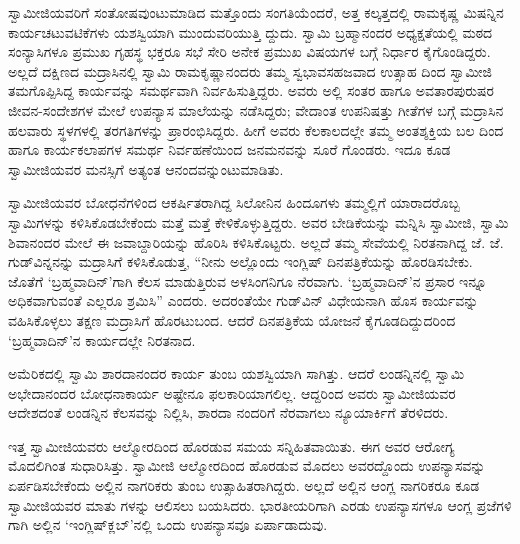 ಸ್ವಾಮೀಜಿಯವರಿಗೆ ಸಂತೋಷವುಂಟುಮಾಡಿದ ಮತ್ತೊಂದು ಸಂಗತಿಯೆಂದರೆ, ಅತ್ತ ಕಲ್ಕತ್ತದಲ್ಲಿ ರಾಮಕೃಷ್ಣ ಮಿಷನ್ನಿನ ಕಾರ್ಯಚಟುವಟಿಕೆಗಳು ಯಶಸ್ವಿಯಾಗಿ ಮುಂದುವರಿಯುತ್ತಿ ದ್ದುದು. ಸ್ವಾಮಿ ಬ್ರಹ್ಮಾನಂದರ ಅಧ್ಯಕ್ಷತೆಯಲ್ಲಿ ಮಠದ ಸಂನ್ಯಾಸಿಗಳೂ ಪ್ರಮುಖ ಗೃಹಸ್ಥ ಭಕ್ತರೂ ಸಭೆ ಸೇರಿ ಅನೇಕ ಪ್ರಮುಖ ವಿಷಯಗಳ ಬಗ್ಗೆ ನಿರ್ಧಾರ ಕೈಗೊಂಡಿದ್ದರು. ಅಲ್ಲದೆ ದಕ್ಷಿಣದ ಮದ್ರಾಸಿನಲ್ಲಿ ಸ್ವಾಮಿ ರಾಮಕೃಷ್ಣಾನಂದರು ತಮ್ಮ ಸ್ವಭಾವಸಹಜವಾದ ಉತ್ಸಾಹ ದಿಂದ ಸ್ವಾಮೀಜಿ ತಮಗೊಪ್ಪಿಸಿದ್ದ ಕಾರ್ಯವನ್ನು ಸಮರ್ಥವಾಗಿ ನಿರ್ವಹಿಸುತ್ತಿದ್ದರು. ಅವರು ಅಲ್ಲಿ ಸಂತರ ಹಾಗೂ ಅವತಾರಪುರುಷರ ಜೀವನ-ಸಂದೇಶಗಳ ಮೇಲೆ ಉಪನ್ಯಾಸ ಮಾಲೆಯನ್ನು ನಡೆಸಿದ್ದರು; ವೇದಾಂತ ಉಪನಿಷತ್ತು ಗೀತೆಗಳ ಬಗ್ಗೆ ಮದ್ರಾಸಿನ ಹಲವಾರು ಸ್ಥಳಗಳಲ್ಲಿ ತರಗತಿಗಳನ್ನು ಪ್ರಾರಂಭಿಸಿದ್ದರು. ಹೀಗೆ ಅವರು ಕೆಲಕಾಲದಲ್ಲೇ ತಮ್ಮ ಅಂತಶ್ಶಕ್ತಿಯ ಬಲ ದಿಂದ ಹಾಗೂ ಕಾರ್ಯಕಲಾಪಗಳ ಸಮರ್ಥ ನಿರ್ವಹಣೆಯಿಂದ ಜನಮನವನ್ನು ಸೂರೆ ಗೊಂಡರು. ಇದೂ ಕೂಡ ಸ್ವಾಮೀಜಿಯವರ ಮನಸ್ಸಿಗೆ ಅತ್ಯಂತ ಆನಂದವನ್ನುಂಟುಮಾಡಿತು.

ಸ್ವಾಮೀಜಿಯವರ ಬೋಧನೆಗಳಿಂದ ಆಕರ್ಷಿತರಾಗಿದ್ದ ಸಿಲೋನಿನ ಹಿಂದೂಗಳು ತಮ್ಮಲ್ಲಿಗೆ ಯಾರಾದರೊಬ್ಬ ಸ್ವಾಮಿಗಳನ್ನು ಕಳಿಸಿಕೊಡಬೇಕೆಂದು ಮತ್ತೆ ಮತ್ತೆ ಕೇಳಿಕೊಳ್ಳುತ್ತಿದ್ದರು. ಅವರ ಬೇಡಿಕೆಯನ್ನು ಮನ್ನಿಸಿ ಸ್ವಾಮೀಜಿ, ಸ್ವಾಮಿ ಶಿವಾನಂದರ ಮೇಲೆ ಈ ಜವಾಬ್ದಾರಿಯನ್ನು ಹೊರಿಸಿ ಕಳಿಸಿಕೊಟ್ಟರು. ಅಲ್ಲದೆ ತಮ್ಮ ಸೇವೆಯಲ್ಲಿ ನಿರತನಾಗಿದ್ದ ಜೆ. ಜೆ. ಗುಡ್​ವಿನ್ನನನ್ನು ಮದ್ರಾಸಿಗೆ ಕಳಿಸಿಕೊಡುತ್ತ, “ನೀನು ಅಲ್ಲೊಂದು ಇಂಗ್ಲಿಷ್ ದಿನಪತ್ರಿಕೆಯನ್ನು ಹೊರಡಿಸಬೇಕು. ಜೊತೆಗೆ ‘ಬ್ರಹ್ಮವಾದಿನ್​’ಗಾಗಿ ಕೆಲಸ ಮಾಡುತ್ತಿರುವ ಅಳಸಿಂಗನಿಗೂ ನೆರವಾಗು. ‘ಬ್ರಹ್ಮವಾದಿನ್​’ನ ಪ್ರಸಾರ ಇನ್ನೂ ಅಧಿಕವಾಗುವಂತೆ ಎಲ್ಲರೂ ಶ್ರಮಿಸಿ” ಎಂದರು. ಅದರಂತೆಯೇ ಗುಡ್​ವಿನ್ ವಿಧೇಯನಾಗಿ ಹೊಸ ಕಾರ್ಯವನ್ನು ವಹಿಸಿಕೊಳ್ಳಲು ತಕ್ಷಣ ಮದ್ರಾಸಿಗೆ ಹೊರಟುಬಂದ. ಆದರೆ ದಿನಪತ್ರಿಕೆಯ ಯೋಜನೆ ಕೈಗೂಡದಿದ್ದುದರಿಂದ ‘ಬ್ರಹ್ಮವಾದಿನ್​’ನ ಕಾರ್ಯದಲ್ಲೇ ನಿರತನಾದ.

ಅಮೆರಿಕದಲ್ಲಿ ಸ್ವಾಮಿ ಶಾರದಾನಂದರ ಕಾರ್ಯ ತುಂಬ ಯಶಸ್ವಿಯಾಗಿ ಸಾಗಿತ್ತು. ಆದರೆ ಲಂಡನ್ನಿನಲ್ಲಿ ಸ್ವಾಮಿ ಅಭೇದಾನಂದರ ಬೋಧನಾಕಾರ್ಯ ಅಷ್ಟೇನೂ ಫಲಕಾರಿಯಾಗಲಿಲ್ಲ. ಆದ್ದರಿಂದ ಅವರು ಸ್ವಾಮೀಜಿಯವರ ಆದೇಶದಂತೆ ಲಂಡನ್ನಿನ ಕೆಲಸವನ್ನು ನಿಲ್ಲಿಸಿ, ಶಾರದಾ ನಂದರಿಗೆ ನೆರವಾಗಲು ನ್ಯೂಯಾರ್ಕಿಗೆ ತೆರಳಿದರು.

ಇತ್ತ ಸ್ವಾಮೀಜಿಯವರು ಆಲ್ಮೋರದಿಂದ ಹೊರಡುವ ಸಮಯ ಸನ್ನಿಹಿತವಾಯಿತು. ಈಗ ಅವರ ಆರೋಗ್ಯ ಮೊದಲಿಗಿಂತ ಸುಧಾರಿಸಿತ್ತು. ಸ್ವಾಮೀಜಿ ಆಲ್ಮೋರದಿಂದ ಹೊರಡುವ ಮೊದಲು ಅವರದ್ದೊಂದು ಉಪನ್ಯಾಸವನ್ನು ಏರ್ಪಡಿಸಬೇಕೆಂದು ಅಲ್ಲಿನ ನಾಗರಿಕರು ತುಂಬ ಉತ್ಸಾಹಿತರಾಗಿದ್ದರು. ಅಲ್ಲದೆ ಅಲ್ಲಿನ ಆಂಗ್ಲ ನಾಗರಿಕರೂ ಕೂಡ ಸ್ವಾಮೀಜಿಯವರ ಮಾತು ಗಳನ್ನು ಆಲಿಸಲು ಬಯಸಿದರು. ಭಾರತೀಯರಿಗಾಗಿ ಎರಡು ಉಪನ್ಯಾಸಗಳೂ ಆಂಗ್ಲ ಪ್ರಜೆಗಳಿ ಗಾಗಿ ಅಲ್ಲಿನ ‘ಇಂಗ್ಲಿಷ್​ಕ್ಲಬ್​’ನಲ್ಲಿ ಒಂದು ಉಪನ್ಯಾಸವೂ ಏರ್ಪಾಡಾದುವು.

